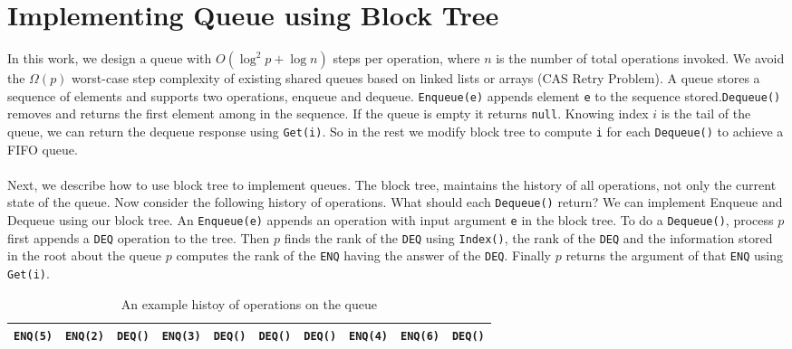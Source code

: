 \documentclass[10pt]{article}
\theoremstyle{definition}
\begin{document}
\section{Implementing Queue using Block Tree}
In this work, we design a queue with $O(\log^2 p +\log n)$ steps per operation, where $n$ is the number of total operations invoked. We avoid the $\Omega(p)$ worst-case step complexity of existing shared queues based on linked lists or arrays (CAS Retry Problem). A queue stores a sequence of elements and supports two operations, enqueue and dequeue. \texttt{Enqueue(e)} appends element \texttt{e} to the sequence stored.\texttt{Dequeue()} removes and returns the first element among in the sequence. If the queue is empty it returns \texttt{null}. Knowing index $i$ is the tail of the queue, we can return the dequeue response using \texttt{Get(i)}.  So in the rest we modify block tree to compute \texttt{i} for each \texttt{Dequeue()} to achieve a FIFO queue.
%
\paragraph{}
Next, we describe how to use block tree to implement queues. The block tree, maintains the history of all operations, not only the current state of the queue. Now consider the following history of operations. What should each \texttt{Dequeue()} return? We can implement Enqueue and Dequeue using our block tree. An \texttt{Enqueue(e)} appends an operation with input argument \texttt{e} in the block tree. To do a \texttt{Dequeue()}, process $p$ first appends a \texttt{DEQ} operation to the tree. Then $p$ finds the rank of the \texttt{DEQ} using \texttt{Index()}, the rank of the \texttt{DEQ} and the information stored in the root about the queue $p$ computes the rank of  the \texttt{ENQ} having the answer of the \texttt{DEQ}. Finally $p$ returns the argument of that \texttt{ENQ} using \texttt{Get(i)}.

\begin{table}[hbt]
\centering
  \begin{tabular}{c|c|c|c|c|c|c|c|c|c}
    \hline \texttt{ENQ(5)}& \texttt{ENQ(2)}& \texttt{DEQ()}& \texttt{ENQ(3)}&\texttt{DEQ()}& \texttt{DEQ()}& \texttt{DEQ()}& \texttt{ENQ(4)}& \texttt{ENQ(6)}& \texttt{DEQ()}\\ \hline
  \end{tabular}
  \caption{An example histoy of operations on the queue}
\end{table}
\end{document}
